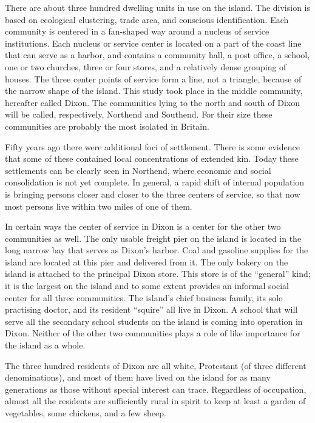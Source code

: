 \documentclass[twoside,symmetric,nobib,justified]{tufte-book}
\begin{document}
There are about three hundred dwelling units in use on the island. The
division is based on ecological clustering, trade area, and conscious
identification. Each community is centered in a fan-shaped way around a
nucleus of service institutions. Each nucleus or service center is
located on a part of the coast line that can serve as a harbor, and
contains a community hall, a post office, a school, one or two churches,
three or four stores, and a relatively dense grouping of houses. The
three center points of service form a line, not a triangle, because of
the narrow shape of the island. This study took place in the middle
community, hereafter called Dixon. The communities lying to the north
and south of Dixon will be called, respectively, Northend and Southend.
For their size these communities are probably the most isolated in
Britain.

Fifty years ago there were additional foci of settlement. There is some
evidence that some of these contained local concentrations of extended
kin. Today these settlements can be clearly seen in Northend, where
economic and social consolidation is not yet complete. In general, a
rapid shift of internal population is bringing persons closer and closer
to the three centers of service, so that now most persons live within
two miles of one of them.

In certain ways the center of service in Dixon is a center for the other
two communities as well. The only usable freight pier on the island is
located in the long narrow bay that serves as Dixon's harbor. Coal and
gasoline supplies for the island are located at this pier and delivered
from it. The only bakery on the island is attached to the principal
Dixon store. This store is of the ``general'' kind; it is the largest on
the island and to some extent provides an informal social center for all
three communities. The island's chief business family, its sole
practising doctor, and its resident ``squire'' all live in Dixon. A
school that will serve all the secondary school students on the island
is coming into operation in Dixon. Neither of the other two communities
plays a role of like importance for the island as a whole.

The three hundred residents of Dixon are all white, Protestant (of three
different denominations), and most of them have lived on the island for
as many generations as those without special interest can trace.
Regardless of occupation, almost all the residents are sufficiently
rural in spirit to keep at least a garden of vegetables, some chickens,
and a few sheep.
\end{document}

